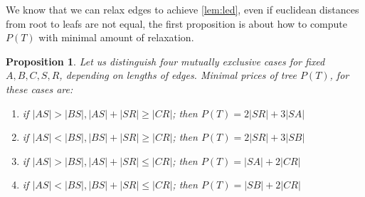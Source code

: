 \documentclass[openany]{book}
\newcommand{\Ptotal}[1]{P(#1)}
\newtheorem{proposition}{Proposition}
\begin{document}
	We know that we can relax edges to achieve \cref{lem:led}, even if euclidean distances from root to leafs are not equal, the first proposition is about how to compute \(\Ptotal{T}\) with minimal amount of relaxation. 
	\begin{proposition}\label{prop:tp} 
		Let us distinguish four mutually exclusive cases for fixed \(A,B,C,S,R\), depending on lengths of edges. Minimal prices of tree \(\Ptotal{T}\), for these cases are:
		\begin{enumerate}
			\item if \( |AS| > |BS|, |AS|+|SR| \geq |CR| \); then \(\Ptotal{T} = 2 |SR| + 3 |SA|\)
			\item if \( |AS| < |BS|, |BS|+|SR| \geq |CR| \); then \(\Ptotal{T} = 2 |SR| + 3 |SB|\)
			\item if \( |AS| > |BS|, |AS|+|SR| \leq |CR| \); then \(\Ptotal{T} = |SA| + 2 |CR|\)
			\item if \( |AS| < |BS|, |BS|+|SR| \leq |CR| \); then \(\Ptotal{T} = |SB| + 2 |CR|\)
		\end{enumerate}
	\end{proposition}
\end{document}
